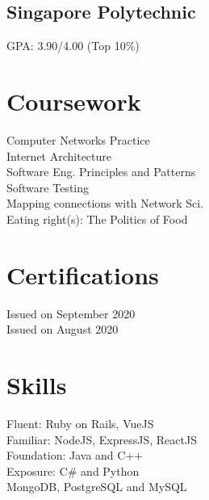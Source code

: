 \documentclass[a4paper]{resume-template} %
\begin{document}
\begin{minipage}[t]{0.34\textwidth}
\subsection{Singapore Polytechnic}
GPA: 3.90/4.00 (Top 10\%)
\sectionsep


\section{Coursework}
Computer Networks Practice\\ 
Internet Architecture\\ 
Software Eng. Principles and Patterns\\ 
Software Testing\\ 
Mapping connections with Network Sci.\\
Eating right(s): The Politics of Food\\
\sectionsep


\section{Certifications}
Issued on September 2020\\
Issued on August 2020
\sectionsep


\section{Skills}
Fluent: Ruby on Rails, VueJS\\
Familiar: NodeJS, ExpressJS, ReactJS\\
Foundation: Java and C++\\
Exposure: C\# and Python\\
MongoDB, PostgreSQL and MySQL\\
\sectionsep

%
%

\end{minipage} 
\end{document}
